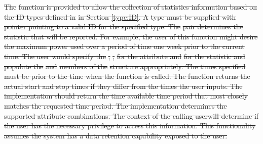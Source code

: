 \documentclass[12pt]{report} %
\providecommand{\DIFdeltex}[1]{{\protect\color{red}\sout{#1}}}                      %
\providecommand{\DIFdelbegin}{} %
\providecommand{\DIFdel}[1]{\texorpdfstring{\DIFdeltex{#1}}{}} %
\newcommand{\DIFscaledelfig}{0.5}
\newlength{\DIFdelgraphicswidth} %
\newlength{\DIFdelgraphicsheight} %
\newcommand{\DIFdelincludegraphics}[2][]{%
\sbox{\DIFdelgraphicsbox}{\DIFOincludegraphics[#1]{#2}}%
\settoboxwidth{\DIFdelgraphicswidth}{\DIFdelgraphicsbox} %
\settoboxtotalheight{\DIFdelgraphicsheight}{\DIFdelgraphicsbox} %
\scalebox{\DIFscaledelfig}{%
\parbox[b]{\DIFdelgraphicswidth}{\usebox{\DIFdelgraphicsbox}\\[-\baselineskip] \rule{\DIFdelgraphicswidth}{0em}}\llap{\resizebox{\DIFdelgraphicswidth}{\DIFdelgraphicsheight}{%
\setlength{\unitlength}{\DIFdelgraphicswidth}%
\begin{picture}(1,1)%
\thicklines\linethickness{2pt} %
{\color[rgb]{1,0,0}\put(0,0){\framebox(1,1){}}}%
{\color[rgb]{1,0,0}\put(0,0){\line( 1,1){1}}}%
{\color[rgb]{1,0,0}\put(0,1){\line(1,-1){1}}}%
\end{picture}%
}\hspace*{3pt}}} %
} %
\DeclareRobustCommand{\DIFdelbegin}{\DIFOdelbegin \let\includegraphics\DIFdelincludegraphics} %
\begin{document}
\DIFdelbegin %
\DIFdel{The }%
\DIFdel{function is provided to allow the collection of statistics information based on the ID types defined in }%
\DIFdel{in Section \ref{type:ID}. 
A }%
\DIFdel{type must be supplied with }%
\DIFdel{pointer pointing to a valid ID for the specified type. 
The }%
\DIFdel{pair determines the statistic that will be reported. 
For example, the user of this function might desire the maximum power used over a period of time one week prior to the current time.
The user would specify the }%
\DIFdel{, }%
\DIFdel{, }%
\DIFdel{for the attribute and }%
\DIFdel{for the statistic and populate the }%
\DIFdel{and }%
\DIFdel{members of the }%
\DIFdel{structure appropriately. 
The times specified must be prior to the time when the function is called.
The function returns the actual start and stop times if they differ from the times the user inputs.
The implementation should return the time available time period that most closely matches the requested time period.
The implementation determines the supported attribute combinations.
The context of the calling userwill determine if the user has the necessary privilege to access this information. 
This functionality assumes the system has a data retention capability exposed to the user.
}%

\end{document}
